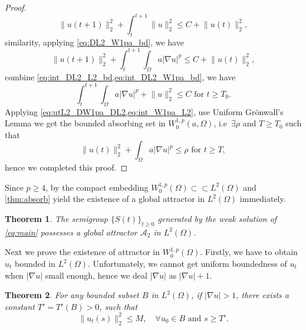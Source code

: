 \documentclass[11pt]{amsart}
\newtheorem{theorem}{Theorem}[section]
\theoremstyle{definition}
\numberwithin{equation}{section}
\newcommand*\abs[1]{\lvert#1\rvert}
\newcommand*\norm[1]{\lVert#1\rVert}
\newcommand*\Brace[1]{\lbrace#1\rbrace}
\begin{document}
\begin{proof}
	\begin{equation}\label{eq:int_DL2_L2_bd}
		\norm{u(t+1)}_2^2
		+ \int_t^{t+1}\norm{u}_2^2
		\leq C + \norm{u(t)}_2^2,
	\end{equation}
	similarity, applying \cref{eq:DL2_W1pa_bd}, we have
	\begin{equation}\label{eq:int_DL2_W1pa_bd}
		\norm{u(t+1)}_2^2
		+ \int_t^{t+1}\int_{\Omega}a \abs{\nabla u}^p
		\leq C + \norm{u(t)}_2^2,
	\end{equation}
	combine \cref{eq:int_DL2_L2_bd,eq:int_DL2_W1pa_bd}, we have
	\begin{equation}\label{eq:int_W1pa_L2}
		\int_t^{t+1}\int_{\Omega}a \abs{\nabla u}^p
		+ \norm{u}_2^2 \leq C \text{ for } t \geq T_0.
	\end{equation}
	Applying \cref{eq:utL2_DW1pa_DL2,eq:int_W1pa_L2}, use Uniform Gr\"onwall's Lemma we get the bounded
	absorbing set in $W_0^{1,p}(a,\Omega)$, i.e\ $\exists \rho$ and $T \geq T_{0}$ such that
	\begin{equation}\label{eq:uL2_W1pa_bd}
		\norm{u(t)}_2^2 + \int_{\Omega}a\abs{\nabla u}^p \leq \rho \text{ for } t \geq T,
	\end{equation}
	hence we completed this proof.
\end{proof}
Since $p \geq 4$, by the compact embedding
$W_0^{1,p}(\Omega) \subset\subset L^2(\Omega)$
and \cref{thm:absorb} yield the existence of a global attractor in $L^2(\Omega)$
immediately.
\begin{theorem}\label{thm:attractor_L2}
	The semigroup $\Brace{S(t)}_{t \geq 0}$ generated by the weak solution of
	\cref{eq:main} possesses a global attractor $\mathcal{A}_2$ in $L^2(\Omega)$.
\end{theorem}
Next we prove the existence of attractor in $W_0^{1,p}(\Omega)$. Firstly, we have
to obtain $u_t$ bounded in $L^2(\Omega)$. Unfortunately, we cannot get
uniform boundedness of $u_t$ when $\abs{\nabla u}$ small enough, hence we deal $\abs{\nabla u}$ as $\abs{\nabla u}+1$.
\begin{theorem}\label{thm:ut_L2_bd}
	For any bounded subset $B$ in $L^2(\Omega)$, if $\abs{\nabla u} > 1$,
	there exists a constant $T' = T'(B) > 0$, such that
	\begin{equation}
		\norm{u_t(s)}_2^2 \leq M, \quad \forall u_0 \in B \text{ and } s \geq T'.
	\end{equation}
\end{theorem}
\end{document}
